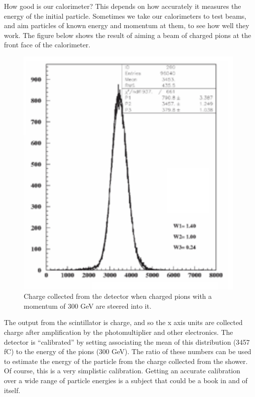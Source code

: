 \noindent
How good is our calorimeter? This depends on how accurately it measures the energy of the initial particle. Sometimes we take our calorimeters to test beams, and aim particles of known energy and momentum at them, to see how well they work. The figure below shows the result of aiming a beam of charged pions at the front face of the calorimeter.

\;
\;

\begin{figure}[h]
\centering\includegraphics[scale=0.5]{./calorimetry/Pictures/fig7.pdf}
\caption{Charge collected from the detector when charged pions with a momentum of 300 GeV are steered into it.}
\label{fig:cal7}
\end{figure}

\;

\noindent
The output from the scintillator is charge, and so the x axis units are collected charge after amplification by the photomultiplier and other electronics. The detector is ``calibrated'' by setting associating the mean of this distribution (3457 fC) to the energy of the pions (300 GeV). The ratio of these numbers can be used to estimate the energy of the particle from the charge collected from the shower.  Of course, this is a very simplistic calibration. Getting an accurate calibration over a wide range of particle energies is a subject that could be a book in and of itself. 

